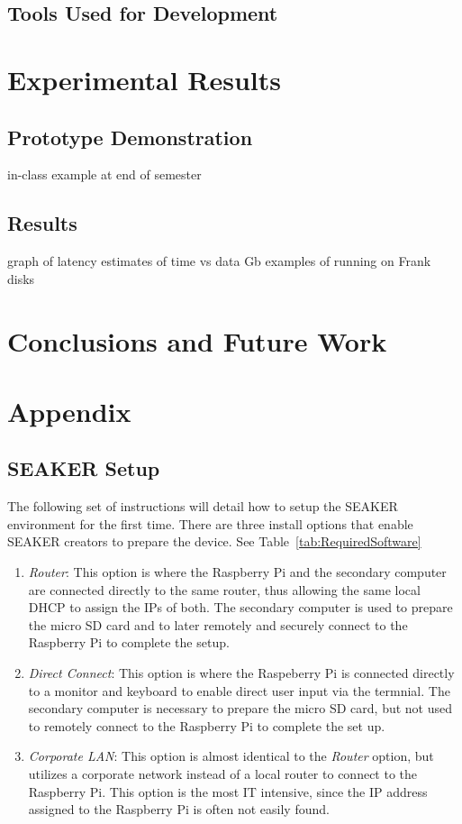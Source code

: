 \documentclass[12pt]{article}
\begin{document}
\subsection{Tools Used for Development}


\section{Experimental Results}
\label{sect-experimentalResults}

\subsection{Prototype Demonstration}
in-class example at end of semester
\subsection{Results}
graph of latency
estimates of time vs data Gb
examples of running on Frank disks


\section{Conclusions and Future Work}
\label{sect-conclusionAndFutureWork}


\section{Appendix}
\label{sect-Appendix}

\subsection{SEAKER Setup}
The following set of instructions will detail how to setup the SEAKER
environment for the first time. There are three install options that
enable SEAKER creators to prepare the device.  See
Table~\ref{tab:RequiredSoftware}

\begin{enumerate}
  \item {\em Router}: This option is where the Raspberry Pi and the
  secondary computer are connected directly to the same router, thus
  allowing the same local DHCP to assign the IPs of both.  The
  secondary computer is used to prepare the micro SD card and to later
  remotely and securely connect to the Raspberry Pi to complete the
  setup.
  
  \item {\em Direct Connect}: This option is where the Raspeberry Pi
  is connected directly to a monitor and keyboard to enable direct
  user input via the termnial.  The secondary computer is necessary to
  prepare the micro SD card, but not used to remotely connect to the
  Raspberry Pi to complete the set up.

  \item {\em Corporate LAN}: This option is almost identical to the
  {\em Router} option, but utilizes a corporate network instead of
  a local router to connect to the Raspberry Pi.  This option is the
  most IT intensive, since the IP address assigned to the Raspberry
  Pi is often not easily found.
\end{enumerate}
\end{document}
